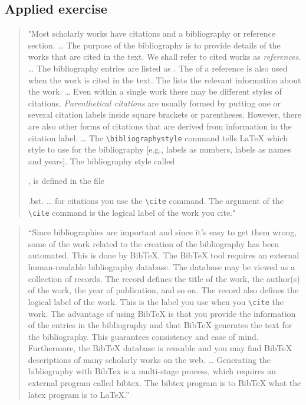 \documentclass[]{tufte-book}
\begin{document}
\hypertarget{applied-exercise-7}{%
\subsection{Applied exercise}\label{applied-exercise-7}}

\begin{quote}
"Most scholarly works have citations and a bibliography or reference section. \ldots{}
The purpose of the bibliography is to provide details of the works that are
cited in the text. We shall refer to cited works as \emph{references}. \ldots{}
The bibliography entries are listed as . The of a reference is also used when the work is
cited in the text. The lists the relevant information
about the work. \ldots{} Even within a single work there may be different styles of
citations. \emph{Parenthetical citations} are usually formed by putting one or
several citation labels inside square brackets or parentheses. However,
there are also other forms of citations that are derived from information in
the citation label. \ldots{} The \texttt{\textbackslash{}bibliographystyle} command tells LaTeX which
style to use for the bibliography {[}e.g., labels as numbers, labels as
names and years{]}. The bibliography style called

, is defined in the
file

.bst. \ldots{} for citations you use the \texttt{\textbackslash{}cite} command. The
argument of the \texttt{\textbackslash{}cite} command is the logical label of the work you cite."
\citep{van2012latex}
\end{quote}

\begin{quote}
``Since bibliographies are important and since it's easy to get them wrong,
some of the work related to the creation of the bibliography has been
automated. This is done by BibTeX. The BibTeX tool requires an external human-readable bibliography database. The database may be viewed as a collection
of records. The record defines the title of the work, the author(s) of the work, the year of publication, and so on. The record also defines the logical
label of the work. This is the label you use when you \texttt{\textbackslash{}cite} the work.
The advantage of using BibTeX is that you provide the information of the
entries in the bibliography and that BibTeX generates the text for the
bibliography. This guarantees consistency and ease of mind. Furthermore,
the BibTeX database is reusable and you may find BibTeX descriptions of
many scholarly works on the web. \ldots{} Generating the bibliography with
BibTex is a multi-stage process, which requires an external program called
bibtex. The bibtex program is to BibTeX what the latex program is to LaTeX.''
\citep{van2012latex}
\end{quote}
\end{document}

